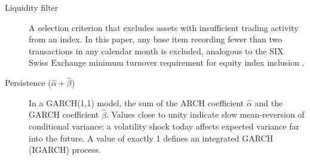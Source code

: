 \begin{description}
  \item[Liquidity filter]
    A selection criterion that excludes assets with insufficient trading
    activity from an index. In this paper, any base item recording fewer than
    two transactions in any calendar month is excluded, analogous to the SIX
    Swiss Exchange minimum turnover requirement for equity index inclusion
    \cite{six2024indexcriteria}.

  \item[Persistence ($\hat{\alpha} + \hat{\beta}$)]
    In a GARCH(1,1) model, the sum of the ARCH coefficient $\hat{\alpha}$ and
    the GARCH coefficient $\hat{\beta}$. Values close to unity indicate slow
    mean-reversion of conditional variance: a volatility shock today affects
    expected variance far into the future. A value of exactly 1 defines an
    integrated GARCH (IGARCH) process.
\end{description}
